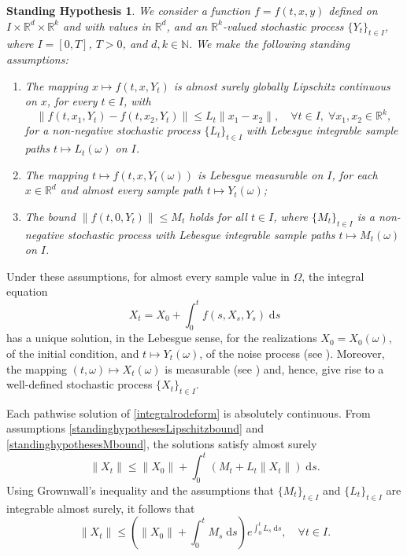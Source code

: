 \documentclass[reqno,12pt]{amsart}
\theoremstyle{plain} %
\newtheorem{stdhyp}{Standing Hypothesis}[section]
\theoremstyle{definition} %
\begin{document}
\begin{stdhyp}
    \label{standinghypotheses1}
    We consider a function $f=f(t, x, y)$ defined on $I\times \mathbb{R}^d\times\mathbb{R}^k$ and with values in $\mathbb{R}^d$, and an $\mathbb{R}^k$-valued stochastic process $\{Y_t\}_{t\in I}$, where $I=[0, T]$, $T > 0$, and $d, k\in \mathbb{N}.$ We make the following standing assumptions:
    \begin{enumerate}
        \item \label{standinghypothesesLipschitzbound} The mapping $x \mapsto f(t, x, Y_t)$ is almost surely globally Lipschitz continuous on $x$, for every $t\in I$, with
        \begin{equation}
            \label{Ltassumptionbasic}
            \|f(t, x_1, Y_t) - f(t, x_2, Y_t)\| \leq L_t \|x_1 - x_2\|, \quad \forall t \in I, \;\forall x_1, x_2 \in\mathbb{R}^k,
        \end{equation}
        for a non-negative stochastic process $\{L_t\}_{t\in I}$ with Lebesgue integrable sample paths $t\mapsto L_t(\omega)$ on $I$.
        
        \item The mapping $t \mapsto f(t, x, Y_t(\omega))$ is Lebesgue measurable on $I$, for each $x\in \mathbb{R}^d$ and almost every sample path $t \mapsto Y_t(\omega)$;
        
        \item \label{standinghypothesesMbound} The bound $\|f(t, 0, Y_t)\| \leq M_t$ holds for all $t\in I$, where $\{M_t\}_{t\in I}$ is a non-negative stochastic process with Lebesgue integrable sample paths $t\mapsto M_t(\omega)$ on $I$.
    \end{enumerate}
\end{stdhyp}

Under these assumptions, for almost every sample value in $\Omega$, the integral equation
\begin{equation}
    \label{integralrodeform}
    X_t = X_0 + \int_0^t f(s, X_s, Y_s) \;\mathrm{d}s
\end{equation}
has a unique solution, in the Lebesgue sense, for the realizations $X_0 = X_0(\omega)$, of the initial condition, and $t\mapsto Y_t(\omega)$, of the noise process (see \cite[Theorem 1.1]{CoddingtonLevinson1985}). Moreover, the mapping $(t, \omega) \mapsto X_t(\omega)$ is measurable (see \cite[Section 2.1.2]{HanKloeden2017}) and, hence, give rise to a well-defined stochastic process $\{X_t\}_{t\in I}$.

Each pathwise solution of \eqref{integralrodeform} is absolutely continuous. From assumptions \eqref{standinghypothesesLipschitzbound} and \eqref{standinghypothesesMbound}, the solutions satisfy almost surely
\[
    \|X_t\| \leq \|X_0\| + \int_0^t (M_t + L_t\|X_t\|)\;\mathrm{d}s.
\]
Using Grownwall's inequality and the assumptions that $\{M_t\}_{t\in I}$ and $\{L_t\}_{t\in I}$ are integrable almost surely, it follows that
\begin{equation}
    \label{XtboundLXMt}
    \|X_t\| \leq \left(\|X_0\| + \int_0^t M_s\;\mathrm{d}s\right) e^{\int_0^t L_s\;\mathrm{d}s}, \quad \forall t\in I.
\end{equation}
\end{document}
